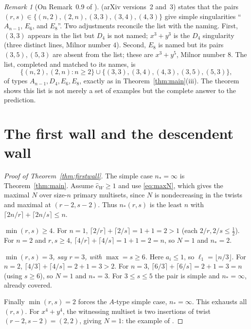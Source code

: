 \documentclass[11pt]{amsart}
\theoremstyle{definition}
\theoremstyle{remark}
\newtheorem{remark}[theorem]{Remark}
\newcommand{\chat}{\hat{c}}
\begin{document}
\begin{remark}[On Remark~0.9 of \cite{GKT}]
\label{rem:erratum}
\cite[Remark~0.9]{GKT} (arXiv versions~2 and~3) states that the pairs
$(r,s)\in\{(n,2),(2,n),(3,3),(3,4),(4,3)\}$ give simple singularities
``$A_{n-1}$, $E_{6}$, and $E_{8}$''. Two adjustments reconcile the list with the
naming. First, $(3,3)$ appears in the list but $D_{4}$ is not named; $x^{3}+y^{3}$
is the $D_{4}$ singularity (three distinct lines, Milnor number $4$). Second,
$E_{8}$ is named but its pairs $(3,5),(5,3)$ are absent from the list; these are
$x^{3}+y^{5}$, Milnor number $8$. The list, completed and matched to its
names, is
\[
\{(n,2),(2,n):n\geq2\}\cup\{(3,3),(3,4),(4,3),(3,5),(5,3)\},
\]
of types $A_{n-1},D_{4},E_{6},E_{8}$, exactly as in Theorem~\ref{thm:main}(iii).
The theorem shows this list is not merely a set of examples but the complete
answer to the prediction.
\end{remark}

\section{The first wall and the descendent wall}
\label{sec:firstwall}

\begin{proof}[Proof of Theorem~\ref{thm:firstwall}]
The simple case $n_{*}=\infty$ is Theorem~\ref{thm:main}. Assume $\chat_{W}\geq1$
and use \eqref{eq:maxN}, which gives the maximal $N$ over size-$n$ primary
multisets, since $N$ is nondecreasing in the twists and maximal at
$(r-2,s-2)$. Thus $n_{*}(r,s)$ is the least $n$ with
$\lceil2n/r\rceil+\lceil2n/s\rceil\leq n$.

\emph{$\min(r,s)\geq4$.} For $n=1$, $\lceil2/r\rceil+\lceil2/s\rceil=1+1=2>1$
(each $2/r,2/s\leq\frac12$). For $n=2$ and $r,s\geq4$,
$\lceil4/r\rceil+\lceil4/s\rceil=1+1=2=n$, so $N=1$ and $n_{*}=2$.

\emph{$\min(r,s)=3$, say $r=3$, with $\max=s\geq6$.} Here $a_{i}\leq1$, so
$\ell_{1}=\lfloor n/3\rfloor$. For $n=2$,
$\lceil4/3\rceil+\lceil4/s\rceil=2+1=3>2$. For $n=3$,
$\lceil6/3\rceil+\lceil6/s\rceil=2+1=3=n$ (using $s\geq6$), so $N=1$ and
$n_{*}=3$. For $3\le s\le5$ the pair is simple and $n_{*}=\infty$, already
covered.

Finally $\min(r,s)=2$ forces the $A$-type simple case, $n_{*}=\infty$. This
exhausts all $(r,s)$. For $x^{4}+y^{4}$, the witnessing multiset is two
insertions of twist $(r-2,s-2)=(2,2)$, giving $N=1$: the example of
\cite[Examples~4.9 and~5.5]{GKTsurvey}.
\end{proof}
\end{document}
